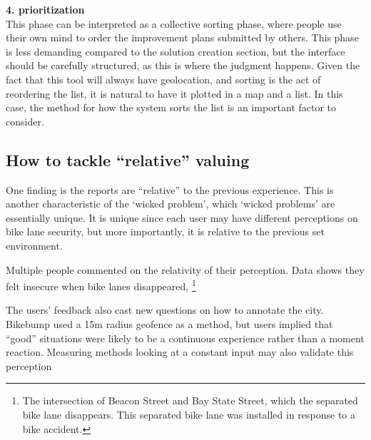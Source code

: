\textbf{4. prioritization} \\
This phase can be interpreted as a collective sorting phase, where people use their own mind to order the improvement plans submitted by others. This phase is less demanding compared to the solution creation section, but the interface should be carefully structured, as this is where the judgment happens. Given the fact that this tool will always have geolocation, and sorting is the act of reordering the list, it is natural to have it plotted in a map and a list. In this case, the method for how the system sorts the list is an important factor to consider.

\subsection{How to tackle ``relative'' valuing}

One finding is the reports are ``relative'' to the previous experience. This is another characteristic of the `wicked problem', which `wicked problems' are essentially unique. 
\cite{rittel1973dilemmas}
It is unique since each user may have different perceptions on bike lane security, but more importantly, it is relative to the previous set environment.

Multiple people commented on the relativity of their perception. Data shows they felt insecure when bike lanes disappeared,
\footnote{The intersection of Beacon Street and Bay State Street, which the separated bike lane disappears. This separated bike lane was installed in response to a bike accident.}

The users’ feedback also cast new questions on how to annotate the city. Bikebump used a 15m radius geofence as a method, but users implied that ``good'' situations were likely to be a continuous experience rather than a moment reaction. Measuring methods looking at a constant input may also validate this perception

